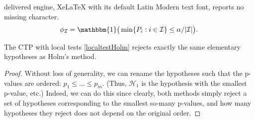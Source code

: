 \documentclass[10pt,a4paper]{amsart}
\newcommand{\Hy}{\mathcal{H}}
\newcommand{\I}{\mathcal{I}}
\begin{document}
delivered engine, XeLaTeX with its default Latin Modern text font, reports no missing character.
\begin{equation} \label{localtestHolm}
\phi_{\I} = \mathbbm{1}\big(\min\{P_i: i\in \I\}\leq \alpha /|\I|\big).
\end{equation}   

\begin{theorem} \label{thmHolmisCTP}
The  CTP with local tests  \eqref{localtestHolm} rejects exactly the same elementary hypotheses as Holm's method.
\end{theorem}

\begin{proof}
Without loss of generality, we can rename the hypotheses such that the  p-values are ordered: $p_{1}\leq ... \leq p_{m}$. (Thus, $\Hy_1$ is the hypothesis with the smallest p-value, etc.) Indeed, we can do this since clearly,  both methods simply reject a set of hypotheses corresponding to the smallest so-many p-values, and how many hypotheses they reject does not depend on the original order.


\end{proof}
\end{document}

